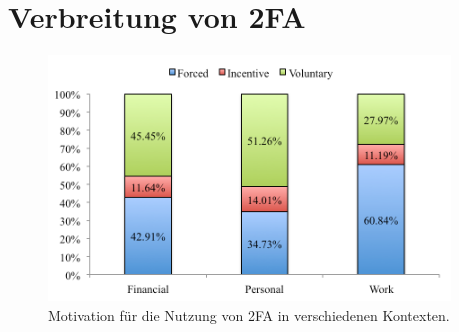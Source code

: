 \chapter{Verbreitung von \acl{2FA}}

\begin{figure}
  \begin{center}
    \includegraphics[width=0.95\textwidth]{assets/motivation.png}
  \end{center}
  \caption[Motivation für die Nutzung von \acs{2FA} in verschiedenen Kontexten]{Motivation für die Nutzung von \acs{2FA} in verschiedenen Kontexten.\\\parencite[6]{decristofaroComparativeUsability2014}}
  \label{fig:motivation}
\end{figure}

